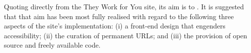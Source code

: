Quoting directly from the They Work for You site, its aim is to .
It is suggested that that aim has been most fully realised with regard to the following three aspects of the site's implementation: (i) a front-end design that engenders accessibility; (ii) the curation of permanent URLs; and (iii)
the provision of open source and freely available code.